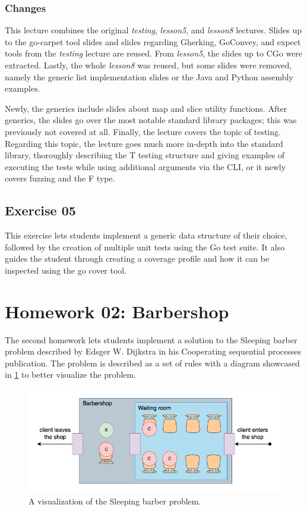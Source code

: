 \documentclass[
  digital,
  color,
  oneside,
  nosansbold,
  nocolorbold,
  nolof,
  nolot,
]{fithesis4}
\begin{document}
\subsubsection{Changes}

This lecture combines the original \textit{testing}, \textit{lesson5}, and \textit{lesson8} lectures. Slides up to the go-carpet tool slides and slides regarding Gherking, GoConvey, and expect tools from the \textit{testing} lecture are reused. From \textit{lesson5}, the slides up to CGo were extracted. Lastly, the whole \textit{lesson8} was reused, but some slides were removed, namely the generic list implementation slides or the Java and Python assembly examples.

Newly, the generics include slides about map and slice utility functions. After generics, the slides go over the most notable standard library packages; this was previously not covered at all. Finally, the lecture covers the topic of testing. Regarding this topic, the lecture goes much more in-depth into the standard library, thoroughly describing the T testing structure and giving examples of executing the tests while using additional arguments via the CLI, or it newly covers fuzzing and the F type.

\subsection{Exercise 05}

This exercise lets students implement a generic data structure of their choice, followed by the creation of multiple unit tests using the Go test suite. It also guides the student through creating a coverage profile and how it can be inspected using the go cover tool.

\section{Homework 02: Barbershop}\label{homework-barbershop}

The second homework lets students implement a solution to the Sleeping barber problem described by Edsger W. Dijkstra in his Cooperating sequential processes publication\cite{ewd-csp}. The problem is described as a set of rules with a diagram showcased in \cref{fig:barbershop} to better visualize the problem.

\begin{figure}[H]
    \centering
    \includegraphics[width=12cm]{figures/barbershop.png}
    \caption{A visualization of the Sleeping barber problem.}
    \label{fig:barbershop}
\end{figure}
\end{document}
